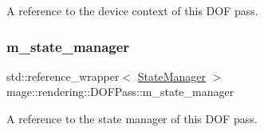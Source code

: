 A reference to the device context of this D\+OF pass. \hypertarget{classmage_1_1rendering_1_1_d_o_f_pass_a41e42d238a1d7471626de8891e5f9ab7}{}\label{classmage_1_1rendering_1_1_d_o_f_pass_a41e42d238a1d7471626de8891e5f9ab7} 
\subsubsection{\texorpdfstring{m\+\_\+state\+\_\+manager}{m\_state\_manager}}
{\footnotesize\ttfamily std\+::reference\+\_\+wrapper$<$ \hyperlink{classmage_1_1rendering_1_1_state_manager}{State\+Manager} $>$ mage\+::rendering\+::\+D\+O\+F\+Pass\+::m\+\_\+state\+\_\+manager\hspace{0.3cm}{\ttfamily [private]}}

A reference to the state manager of this D\+OF pass. 